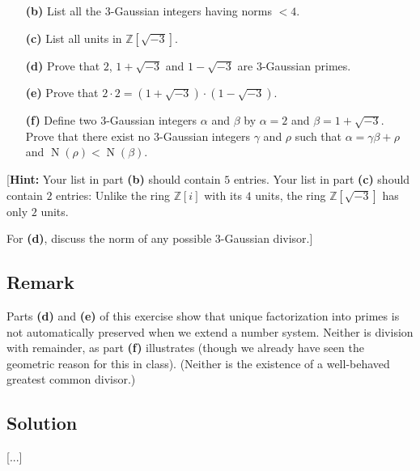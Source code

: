 \documentclass[paper=a4, fontsize=12pt]{scrartcl} %
\newcommand{\ZZ}{\mathbb{Z}} %
\newcommand{\tup}[1]{\left( #1 \right)}
\newcommand{\ive}[1]{\left[ #1 \right]}
\newcommand{\N}{\operatorname{N}} %
\theoremstyle{plainsl}
\theoremstyle{definition}
\theoremstyle{remark}
\begin{document}
\begin{enumerate}

\item[\textbf{(b)}]
List all the $3$-Gaussian integers having norms $< 4$.

\item[\textbf{(c)}]
List all units in $\ZZ\ive{\sqrt{-3}}$.

\item[\textbf{(d)}]
Prove that $2$, $1 + \sqrt{-3}$ and $1 - \sqrt{-3}$ are
$3$-Gaussian primes.

\item[\textbf{(e)}]
Prove that
$2 \cdot 2 = \tup{1 + \sqrt{-3}} \cdot \tup{1 - \sqrt{-3}}$.

\item[\textbf{(f)}]
Define two $3$-Gaussian integers $\alpha$ and $\beta$
by $\alpha = 2$ and $\beta = 1 + \sqrt{-3}$.
Prove that there exist no $3$-Gaussian integers $\gamma$
and $\rho$ such that $\alpha = \gamma \beta + \rho$
and $\N\tup{\rho} < \N\tup{\beta}$.

\end{enumerate}

[\textbf{Hint:} Your list in part \textbf{(b)} should
contain $5$ entries.
Your list in part \textbf{(c)} should contain $2$
entries: Unlike the ring $\ZZ\ive{i}$ with its $4$ units,
the ring $\ZZ\ive{\sqrt{-3}}$
has only $2$ units.

For \textbf{(d)}, discuss the norm
of any possible $3$-Gaussian divisor.]

\subsection{Remark}

Parts \textbf{(d)} and \textbf{(e)} of this exercise
show that unique factorization into primes is not
automatically preserved when we extend a number system.
Neither is division with remainder, as part \textbf{(f)}
illustrates (though we already have seen the geometric
reason for this in class).
(Neither is the existence of a well-behaved greatest
common divisor.)

\subsection{Solution}

[...]
\end{document}
